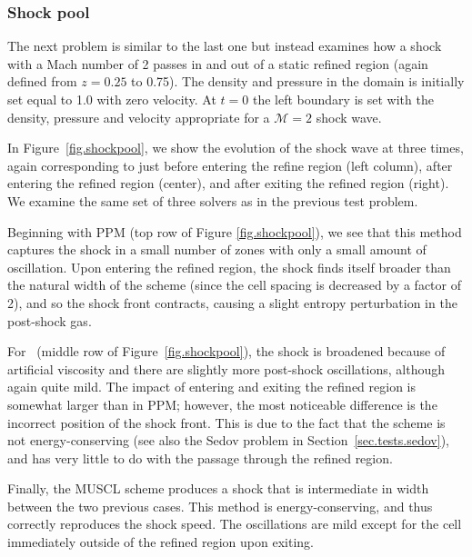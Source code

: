\subsubsection{Shock pool}
\label{sec.tests.shockpool}

The next problem is similar to the last one but instead examines how a shock with a Mach number of 2 passes in and out of a static refined region (again defined from $z=0.25$ to 0.75).  The density and pressure in the domain is initially set equal to 1.0 with zero velocity.  At $t=0$ the left boundary is set with the density, pressure and velocity appropriate for a $\mathcal{M}=2$ shock wave.

In Figure~\ref{fig.shockpool}, we show the evolution of the shock wave at three times, again corresponding to just before entering the refine region (left column), after entering the refined region (center), and after exiting the refined region (right).  We examine the same set of three solvers as in the previous test problem.

Beginning with PPM (top row of Figure \ref{fig.shockpool}), we see that this method captures the shock in a small number of zones with only a small amount of oscillation.  Upon entering the refined region, the shock finds itself broader than the natural width of the scheme (since the cell spacing is decreased by a factor of 2), and so the shock front contracts, causing a slight entropy perturbation in the post-shock gas. 

For \zeus\ (middle row of Figure~\ref{fig.shockpool}), the shock is broadened because of artificial viscosity and there are slightly more post-shock oscillations, although again quite mild.  The impact of entering and exiting the refined region is somewhat larger than in PPM; however, the most noticeable difference is the incorrect position of the shock front. This is due to the fact that the scheme is not energy-conserving (see also the Sedov problem in Section~\ref{sec.tests.sedov}), and has very little to do with the passage through the refined region.

Finally, the MUSCL scheme produces a shock that is intermediate in width between the two previous cases.  This method is energy-conserving, and thus correctly reproduces the shock speed.  The oscillations are mild except for the cell immediately outside of the refined region upon exiting.


